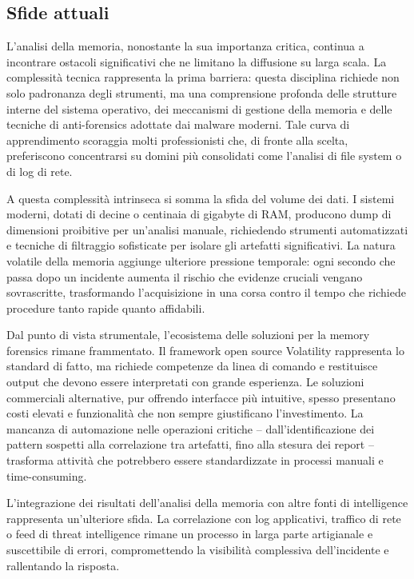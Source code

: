 \subsection{Sfide attuali}

L'analisi della memoria, nonostante la sua importanza critica, continua a incontrare ostacoli significativi che ne limitano la diffusione su larga scala. La complessità tecnica rappresenta la prima barriera: questa disciplina richiede non solo padronanza degli strumenti, ma una comprensione profonda delle strutture interne del sistema operativo, dei meccanismi di gestione della memoria e delle tecniche di anti-forensics adottate dai malware moderni. Tale curva di apprendimento scoraggia molti professionisti che, di fronte alla scelta, preferiscono concentrarsi su domini più consolidati come l'analisi di file system o di log di rete.

A questa complessità intrinseca si somma la sfida del volume dei dati. I sistemi moderni, dotati di decine o centinaia di gigabyte di RAM, producono dump di dimensioni proibitive per un'analisi manuale, richiedendo strumenti automatizzati e tecniche di filtraggio sofisticate per isolare gli artefatti significativi. La natura volatile della memoria aggiunge ulteriore pressione temporale: ogni secondo che passa dopo un incidente aumenta il rischio che evidenze cruciali vengano sovrascritte, trasformando l'acquisizione in una corsa contro il tempo che richiede procedure tanto rapide quanto affidabili.

Dal punto di vista strumentale, l'ecosistema delle soluzioni per la memory forensics rimane frammentato. Il framework open source Volatility rappresenta lo standard di fatto, ma richiede competenze da linea di comando e restituisce output che devono essere interpretati con grande esperienza. Le soluzioni commerciali alternative, pur offrendo interfacce più intuitive, spesso presentano costi elevati e funzionalità che non sempre giustificano l'investimento. La mancanza di automazione nelle operazioni critiche – dall'identificazione dei pattern sospetti alla correlazione tra artefatti, fino alla stesura dei report – trasforma attività che potrebbero essere standardizzate in processi manuali e time-consuming.

L'integrazione dei risultati dell'analisi della memoria con altre fonti di intelligence rappresenta un'ulteriore sfida. La correlazione con log applicativi, traffico di rete o feed di threat intelligence rimane un processo in larga parte artigianale e suscettibile di errori, compromettendo la visibilità complessiva dell'incidente e rallentando la risposta.

